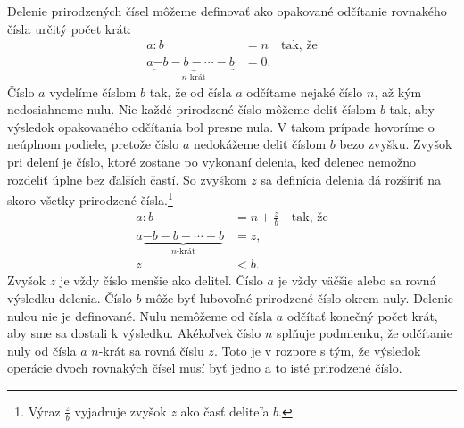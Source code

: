 \documentclass{article}
\begin{document}
Delenie prirodzených čísel môžeme definovať ako opakované odčítanie rovnakého čísla určitý počet krát:
\[
\begin{aligned}
  a : b &= n \quad \text{tak, že}\\
  a \underbrace{- b - b - \cdots - b}_{n\text{-krát}} &= 0.
\end{aligned}
\]
Číslo \(a\) vydelíme číslom \(b\) tak, že od čísla \(a\) odčítame nejaké číslo \(n\), až kým nedosiahneme nulu. Nie každé prirodzené číslo môžeme deliť číslom \(b\) tak, aby výsledok opakovaného odčítania bol presne nula. V takom prípade hovoríme o neúplnom podiele, pretože číslo \(a\) nedokážeme deliť číslom \(b\) bezo zvyšku. Zvyšok pri delení je číslo, ktoré zostane po vykonaní delenia, keď delenec nemožno rozdeliť úplne bez ďalších častí. So zvyškom \(z\) sa definícia delenia dá rozšíriť na skoro všetky prirodzené čísla.\footnote{Výraz \(\frac{z}{b}\) vyjadruje zvyšok \(z\) ako časť deliteľa \(b\).}
\[
\begin{aligned}
  a : b &= n + \frac{z}{b} \quad \text{tak, že}\\
  a \underbrace{- b - b - \cdots - b}_{n\text{-krát}} &= z, \\
  z &< b.
\end{aligned}
\]
Zvyšok \(z\) je vždy číslo menšie ako deliteľ. Číslo \(a\) je vždy väčšie alebo sa rovná výsledku delenia. Číslo \(b\) môže byť ľubovoľné prirodzené číslo okrem nuly. Delenie nulou nie je definované. Nulu nemôžeme od čísla \(a\) odčítať konečný počet krát, aby sme sa dostali k výsledku. Akékoľvek číslo \(n\) splňuje podmienku, že odčítanie nuly od čísla \(a\) \(n\)-krát sa rovná číslu \(z\). Toto je v rozpore s tým, že výsledok operácie dvoch rovnakých čísel musí byť jedno a to isté prirodzené číslo.
\end{document}
